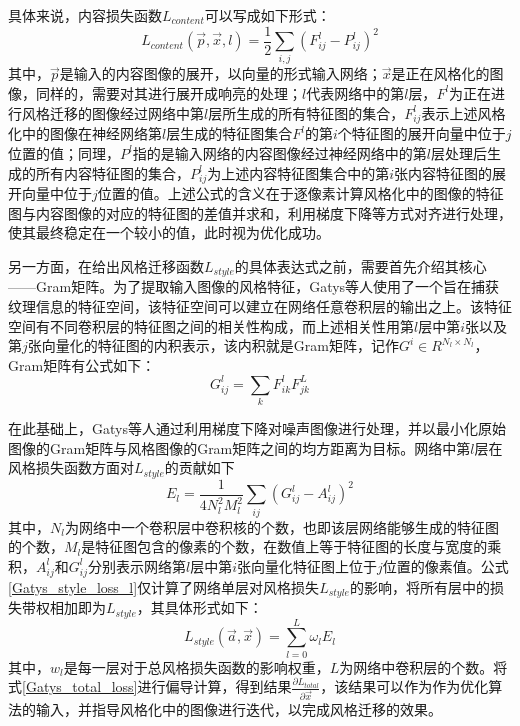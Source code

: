 具体来说，内容损失函数$L_{content}$可以写成如下形式：
\begin{equation}
    L_{content}\left(\vec{p},\vec{x},l\right)=\frac{1}{2} \sum_{i,j} \left(F_{ij}^l-P_{ij}^l\right)^2
\end{equation}
其中，$\vec{p}$是输入的内容图像的展开，以向量的形式输入网络；$\vec{x}$是正在风格化的图像，同样的，需要对其进行展开成响亮的处理；$l$代表网络中的第$l$层，$F^l$为正在进行风格迁移的图像经过网络中第$l$层所生成的所有特征图的集合，$F_{ij}^l$表示上述风格化中的图像在神经网络第$l$层生成的特征图集合$F^l$的第$i$个特征图的展开向量中位于$j$位置的值；同理，$P^l$指的是输入网络的内容图像经过神经网络中的第$l$层处理后生成的所有内容特征图的集合，$P_{ij}^l$为上述内容特征图集合中的第$i$张内容特征图的展开向量中位于$j$位置的值。上述公式的含义在于逐像素计算风格化中的图像的特征图与内容图像的对应的特征图的差值并求和，利用梯度下降等方式对齐进行处理，使其最终稳定在一个较小的值，此时视为优化成功。

另一方面，在给出风格迁移函数$L_{style}$的具体表达式之前，需要首先介绍其核心——Gram矩阵。为了提取输入图像的风格特征，Gatys等人\cite{gatysImageStyleTransfer2016}使用了一个旨在捕获纹理信息的特征空间，该特征空间可以建立在网络任意卷积层的输出之上。该特征空间有不同卷积层的特征图之间的相关性构成，而上述相关性用第$l$层中第$i$张以及第$j$张向量化的特征图的内积表示，该内积就是Gram矩阵，记作$G^i \in R^{N_l\times N_l}$，Gram矩阵有公式如下：
\begin{equation}
    G_{ij}^l=\sum_k F_{ik}^lF_{jk}^L
\end{equation}

在此基础上，Gatys等人通过利用梯度下降对噪声图像进行处理，并以最小化原始图像的Gram矩阵与风格图像的Gram矩阵之间的均方距离为目标。网络中第$l$层在风格损失函数方面对$L_{style}$的贡献如下
\begin{equation}
    \label{Gatys_style_loss_l}
    E_l = \frac{1}{4N_l^2M_l^2}\sum_{ij}\left(G_{ij}^l-A_{ij}^l\right)^2
\end{equation}
其中，$N_l$为网络中一个卷积层中卷积核的个数，也即该层网络能够生成的特征图的个数，$M_l$是特征图包含的像素的个数，在数值上等于特征图的长度与宽度的乘积，$A_{ij}^l$和$G_{ij}^l$分别表示网络第$l$层中第$i$张向量化特征图上位于$j$位置的像素值。公式\ref{Gatys_style_loss_l}仅计算了网络单层对风格损失$L_{style}$的影响，将所有层中的损失带权相加即为$L_{style}$，其具体形式如下：
\begin{equation}
    L_{style}\left(\vec{a},\vec{x}\right)=\sum_{l=0}^L \omega_l E_l
\end{equation}  
其中，$w_l$是每一层对于总风格损失函数的影响权重，$L$为网络中卷积层的个数。将式\ref{Gatys_total_loss}进行偏导计算，得到结果$\frac{\partial L_{total}}{\partial \vec{x}}$，该结果可以作为作为优化算法的输入，并指导风格化中的图像进行迭代，以完成风格迁移的效果。

